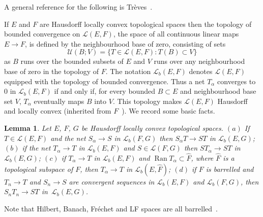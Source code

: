 \documentclass[pdftex]{sigma}
\numberwithin{equation}{section}
\newtheorem{Lemma}[Theorem]{Lemma}
\newcommand{\LL}{{\mathcal L}}
\newcommand{\Ran}{\operatorname{Ran}}
\newcommand{\Uf}{{\mathscr U}}
\begin{document}
 A general reference for the following is Tr\`eves~\cite[Chapter~32]{Treves:TVS}.

 If $E$ and $F$ are Hausdorff locally convex topological spaces then the topology of bounded convergence on $\LL(E,F)$, the space of all continuous linear maps $E\to F$, is defined by the neighbourhood base of zero, consisting of sets
 \begin{equation*}
 	\Uf(B;V) = \{T\in \LL(E,F)\colon T(B)\subset V\}
 \end{equation*}
 as $B$ runs over the bounded subsets of $E$ and $V$ runs over any neighbourhood base of zero in the topology of $F$. The notation $\LL_b(E,F)$ denotes $\LL(E,F)$ equipped with the topology of bounded convergence.
 Thus a net $T_\alpha$ converges to $0$ in $\LL_b(E,F)$
 if and only if, for every bounded $B\subset E$ and neighbourhood base set $V$,
 $T_\alpha$ eventually maps $B$ into $V$. This topology makes $\LL(E,F)$ Hausdorff and locally convex (inherited from $F$~\cite[p.~336]{Treves:TVS}). We record some basic facts.
 \begin{Lemma}\label{lem:Lb_basic}
 	Let $E$, $F$, $G$ be Hausdorff locally convex topological spaces. $(a)$ If $T\in \LL(E,F)$ and the net $S_\alpha\to S$ in $\LL_b(F,G)$ then $S_\alpha T\to ST$ in $\LL_b(E,G)$; $(b)$ if the net $T_\alpha\to T$ in $\LL_b(E,F)$ and $S\in \LL(F,G)$ then
 	$ST_\alpha\to ST$ in $\LL_b(E,G)$; $(c)$ if $T_\alpha\to T$ in $\LL_b(E,F)$ and $\Ran T_\alpha\subset \hat{F}$, where $\hat{F}$ is a topological subspace of $F$, then $T_\alpha\to T$ in $\LL_b(E,\hat{F})$; $(d)$ if $F$ is barrelled and $T_n\to T$ and $S_n\to S$ are convergent \emph{sequences} in $\LL_b(E,F)$ and $\LL_b(F,G)$, then $S_n T_n\to ST$ in~$\LL_b(E,G)$.
 \end{Lemma}
 Note that Hilbert, Banach, Fr\'echet and LF spaces are all barrelled~\cite[Chapter~33]{Treves:TVS}.
\end{document}
